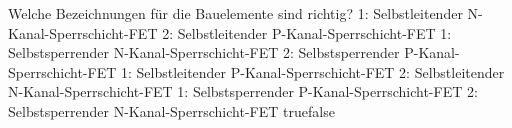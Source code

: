     {Welche Bezeichnungen für die Bauelemente sind richtig?}
    {1: Selbstleitender N-Kanal-Sperrschicht-FET
2: Selbstleitender P-Kanal-Sperrschicht-FET}
    {1: Selbstsperrender N-Kanal-Sperrschicht-FET
2: Selbstsperrender P-Kanal-Sperrschicht-FET}
    {1: Selbstleitender P-Kanal-Sperrschicht-FET
2: Selbstleitender N-Kanal-Sperrschicht-FET}
    {1: Selbstsperrender P-Kanal-Sperrschicht-FET
2: Selbstsperrender N-Kanal-Sperrschicht-FET}
    {true}{false}